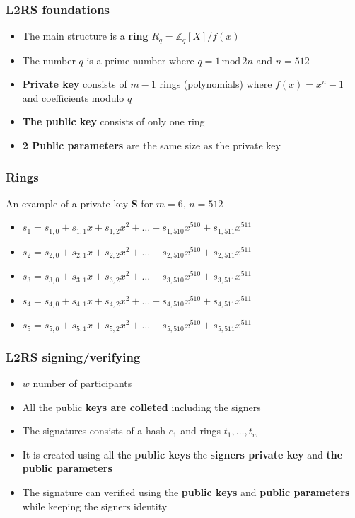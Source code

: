 \documentclass[%
  14pt,       				%
	c,                  %
	aspectratio=1610,   %
	unicode,						%
]{beamer}				    	%
\begin{document}
\begin{frame}
  \frametitle{L2RS foundations}
  \large{
    \begin{itemize}
      \item The main structure is a \textbf{ring} $R_q = \mathbb{Z}_q[X]/f(x)$
      \item The number $q$ is a prime number where $q=1\,\mathrm{mod}\,2n$ and $n=512$
      \item \textbf{Private key} consists of $m-1$ rings (polynomials) where $f(x) = x^n - 1$ and coefficients modulo $q$ 
      \item \textbf{The public key} consists of only one ring
      \item \textbf{2 Public parameters} are the same size as the private key
    \end{itemize}
  }
\end{frame}

\begin{frame}
  \frametitle{Rings}
  \large{
    An example of a private key \textbf{S} for $m=6$, $n=512$
    \begin{itemize}
      \item $s_1 = s_{1,0} + s_{1,1}x + s_{1,2}x^2 + \dots + s_{1,510}x^{510} + s_{1,511}x^{511}$
      \item $s_2 = s_{2,0} + s_{2,1}x + s_{2,2}x^2 + \dots + s_{2,510}x^{510} + s_{2,511}x^{511}$
      \item $s_3 = s_{3,0} + s_{3,1}x + s_{3,2}x^2 + \dots + s_{3,510}x^{510} + s_{3,511}x^{511}$
      \item $s_4 = s_{4,0} + s_{4,1}x + s_{4,2}x^2 + \dots + s_{4,510}x^{510} + s_{4,511}x^{511}$
      \item $s_5 = s_{5,0} + s_{5,1}x + s_{5,2}x^2 + \dots + s_{5,510}x^{510} + s_{5,511}x^{511}$
    \end{itemize}
  }
\end{frame}

\begin{frame}
  \frametitle{L2RS signing/verifying}
  \large{
    \begin{itemize}
      \item $w$ number of participants
      \item All the public \textbf{keys are colleted} including the signers
      \item The signatures consists of a hash $c_1$ and rings $t_1,\dots,t_w$
      \item It is created using all the \textbf{public keys} the \textbf{signers private key} and \textbf{the public parameters}
      \item The signature can verified using the \textbf{public keys} and \textbf{public parameters} while keeping the signers identity
    \end{itemize}
  }
\end{frame}
\end{document}
